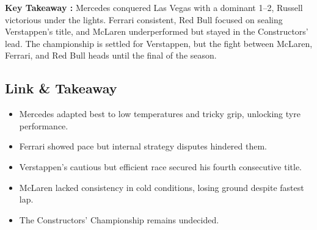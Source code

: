 \textbf{Key Takeaway :} Mercedes conquered Las Vegas with a dominant 1–2, Russell victorious under the lights. Ferrari consistent, Red Bull focused on sealing Verstappen’s title, and McLaren underperformed but stayed in the Constructors’ lead. The championship is settled for Verstappen, but the fight between McLaren, Ferrari, and Red Bull heads until the final of the season.

\subsection{Link \& Takeaway}

\begin{itemize}
    \item Mercedes adapted best to low temperatures and tricky grip, unlocking tyre performance. 
    \item Ferrari showed pace but internal strategy disputes hindered them. 
    \item Verstappen’s cautious but efficient race secured his fourth consecutive title. 
    \item McLaren lacked consistency in cold conditions, losing ground despite fastest lap. 
    \item The Constructors’ Championship remains undecided. 
\end{itemize}
